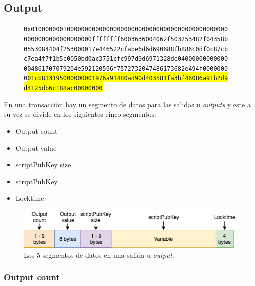 \documentclass{article}
\begin{document}
    \subsection{Output}
    
    \begin{figure}[H]
        \texttt{0x0100000001000000000000000000000000000000000000000000000} \\
        \texttt{0000000000000000000ffffffff6003636004062f503253482f04358b} \\
        \texttt{0553084404f253000017e446522cfabe6d6d690688fb886c0df0c87cb} \\
        \texttt{c7ea4f7f1b5c0050bd0ac3751cfc997d9d6971328de04000000000000} \\
        \texttt{004861707079204e592120596f7572732047486173682e494f0000000} \\
        \texttt{0\colorbox{Yellow}{01cb813195000000001976a91480ad90d403581fa3bf46086a91b2d9}} \\
        \texttt{\colorbox{Yellow}{d4125db6c188ac00000000}}
    \end{figure}
    
    En una transacción hay un segmento de datos para las salidas u \textit{outputs} y este a su vez se divide en los siguientes cinco segmentos:
    
    \begin{itemize}
    \item Output count
    \item Output value
    \item scriptPubKey size
    \item scriptPubKey
    \item Locktime
    \end{itemize}
    
    \begin{figure}[H]
    \centering
        \includegraphics[scale=0.57]{img/Bitcoin_transactions_data_output.png}
        \caption{Los 5 segmentos de datos en una salida u \textit{output}.}
    \end{figure}
    
    \subsubsection{Output count}
    
\end{document}
